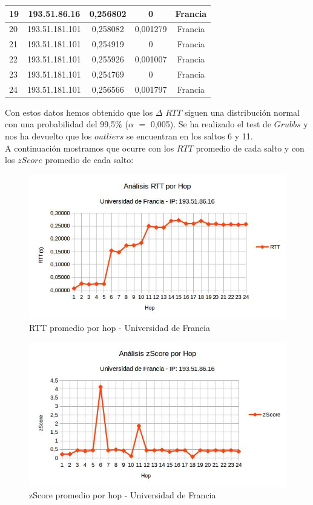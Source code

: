 \begin{tabular}{ | l | c | c | c | c |}
  \hline 
   19 & 193.51.86.16 & 0,256802 & 0 & Francia\\
  \hline 
   20 & 193.51.181.101 & 0,258082 & 0,001279 & Francia\\
  \hline 
   21 & 193.51.181.101 & 0,254919 & 0 & Francia\\
  \hline 
   22 & 193.51.181.101 & 0,255926 & 0,001007 & Francia\\
  \hline 
   23 & 193.51.181.101 & 0,254769 & 0 & Francia\\
  \hline 
   24 & 193.51.181.101 & 0,256566 & 0,001797 & Francia\\    
 \hline 
\end{tabular}

\bigskip

Con estos datos hemos obtenido que los $\Delta$ $RTT$ siguen una distribución normal con una probabilidad del 99,5$\%$ ($\alpha$ $=$ 0,005).
Se ha realizado el test de $Grubbs$ y nos ha devuelto que los $outliers$ se encuentran en los saltos 6 y 11.\\

A continuación mostramos que ocurre con los $RTT$ promedio de cada salto y con los $zScore$ promedio de cada salto:

\begin{figure}[H]
\centering
\includegraphics[width=1\textwidth]{graficos/rTT_Francia.jpg}
\caption{RTT promedio por hop - Universidad de Francia}
\label{francia_rtt}
\end{figure}

\begin{figure}[H]
\centering
\includegraphics[width=1\textwidth]{graficos/zScore_Francia.jpg}
\caption{zScore promedio por hop - Universidad de Francia}
\label{francia_zs}
\end{figure}

